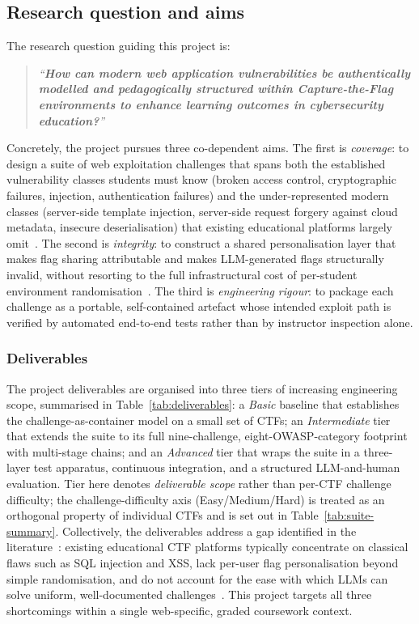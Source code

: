 \subsection{Research question and aims}

The research question guiding this project is:
\begin{quote}
\textit{``\textbf{How can modern web application vulnerabilities be authentically
modelled and pedagogically structured within Capture-the-Flag
environments to enhance learning outcomes in cybersecurity education?}''}
\end{quote}

Concretely, the project pursues three co-dependent aims. The first is
\textit{coverage}: to design a suite of web exploitation challenges
that spans both the established vulnerability classes students must
know (broken access control, cryptographic failures, injection,
authentication failures) and the under-represented modern classes
(server-side template injection, server-side request forgery against
cloud metadata, insecure deserialisation) that existing educational
platforms largely omit~\cite{Sasiwanit}. The second is
\textit{integrity}: to construct a shared personalisation layer that
makes flag sharing attributable and makes LLM-generated flags
structurally invalid, without resorting to the full infrastructural
cost of per-student environment randomisation~\cite{secgen2017}.
The third is \textit{engineering rigour}: to package each challenge
as a portable, self-contained artefact whose intended exploit path
is verified by automated end-to-end tests rather than by instructor
inspection alone.

\subsubsection{Deliverables}
The project deliverables are organised into three tiers of increasing
engineering scope, summarised in Table~\ref{tab:deliverables}: a
\textit{Basic} baseline that establishes the
challenge-as-container model on a small set of CTFs; an
\textit{Intermediate} tier that extends the suite to its full
nine-challenge, eight-OWASP-category footprint with multi-stage
chains; and an \textit{Advanced} tier that wraps the suite in a
three-layer test apparatus, continuous integration, and a structured
LLM-and-human evaluation. Tier here denotes \emph{deliverable
scope} rather than per-CTF challenge difficulty; the
challenge-difficulty axis (Easy/Medium/Hard) is treated as an
orthogonal property of individual CTFs and is set out in
Table~\ref{tab:suite-summary}. Collectively, the deliverables
address a gap identified in the
literature~\cite{Svabensky2021,Vykopal,Sasiwanit}: existing
educational CTF platforms typically concentrate on classical
flaws such as SQL injection and XSS, lack per-user flag
personalisation beyond simple randomisation, and do not
account for the ease with which LLMs can solve uniform,
well-documented challenges~\cite{ji2025}.
This project targets all three shortcomings within a single
web-specific, graded coursework context.


